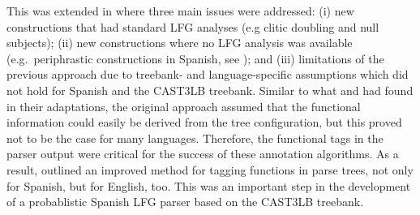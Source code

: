 \documentclass[output=paper,hidelinks]{langscibook}
\begin{document}
This was extended in \citet{ChrupalaImproving:lfg06} where three main issues were addressed: (i) new constructions that had standard LFG analyses (e.g clitic doubling and null subjects); (ii) new constructions where no LFG analysis was available (e.g.\ periphrastic constructions in Spanish, see ); and (iii) limitations of the previous approach due to treebank- and language-specific assumptions which did not hold for Spanish and the CAST3LB treebank. Similar to what \citet{GuoTreebank:lfg07} and \citet{RehbeinAutomatic:lfg09} had found in their adaptations, the original approach assumed that the functional information could easily be derived from the tree configuration, but this proved not to be the case for many languages. Therefore, the functional tags in the parser output were critical for the success of these annotation algorithms. As a result, \citet{ChrupalaImproving:lfg06} outlined an improved method for tagging functions in parse trees, not only for Spanish, but for English, too. This was an important step in the development of a probablistic Spanish LFG parser based on the CAST3LB treebank. 

%    
\end{document}
